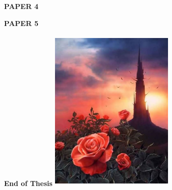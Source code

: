 \documentclass[
  12pt,
]{book}
\begin{document}


\begin{center}
\textbf{\fontsize{70}{1} \selectfont PAPER 4}
\end{center}



\begin{center}
\textbf{\fontsize{70}{1} \selectfont PAPER 5}
\end{center}



\begin{center}
\textbf{\fontsize{70}{1} \selectfont End of Thesis}
\vfill
\includegraphics[width=6cm, height=8cm]{img/rose.jpg}
\end{center}

%
\end{document}
